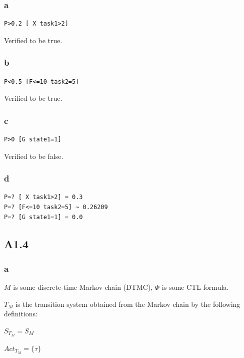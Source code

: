 \subsubsection{a}

\begin{verbatim}
P>0.2 [ X task1>2]
\end{verbatim}

Verified to be true.

\subsubsection{b}

\begin{verbatim}
P<0.5 [F<=10 task2=5]
\end{verbatim}

Verified to be true.

\subsubsection{c}

\begin{verbatim}
P>0 [G state1=1]
\end{verbatim}

Verified to be false.

\subsubsection{d}

\begin{verbatim}
P=? [ X task1>2] = 0.3
P=? [F<=10 task2=5] ~ 0.26209
P=? [G state1=1] = 0.0
\end{verbatim}

\subsection{A1.4}

\subsubsection{a}

$M$ is some discrete-time Markov chain (DTMC),
$\Phi$ is some CTL formula.

$T_M$ is the transition system obtained from the Markov chain
by the following definitions:

$S_{T_M} = S_M$

$Act_{T_M} = \{\tau\}$

